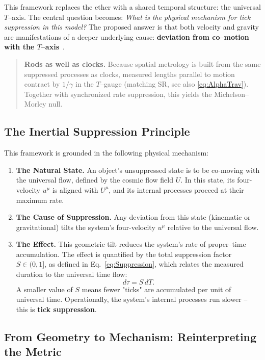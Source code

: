 \documentclass[12pt]{article}
\theoremstyle{plain}
\begin{document}
\medskip
\noindent
This framework replaces the ether with a shared temporal structure: the universal $T$–axis. The central question becomes: \textit{What is the physical mechanism for tick suppression in this model?} The proposed answer is that both velocity and gravity are manifestations of a deeper underlying cause: \textbf{deviation from co–motion with the $T$–axis}~\cite{Mermin1984}.

\begin{quote}\footnotesize
\textbf{Rods as well as clocks.} Because spatial metrology is built from the same suppressed processes as clocks, measured lengths parallel to motion contract by $1/\gamma$ in the $T$–gauge (matching SR, see also \eqref{eq:AlphaTrav}). Together with synchronized rate suppression, this yields the Michelson–Morley null.
\end{quote}

\subsection{The Inertial Suppression Principle}

This framework is grounded in the following physical mechanism:

\begin{enumerate}
    \item \textbf{The Natural State.} An object's unsuppressed state is to be co-moving with the universal flow, defined by the cosmic flow field $U$. In this state, its four-velocity $u^\mu$ is aligned with $U^\mu$, and its internal processes proceed at their maximum rate.

    \item \textbf{The Cause of Suppression.} Any deviation from this state (kinematic or gravitational) tilts the system’s four-velocity $u^\mu$ relative to the universal flow.

    \item \textbf{The Effect.} This geometric tilt reduces the system's rate of proper–time accumulation. The effect is quantified by the total suppression factor $S \in (0,1]$, as defined in Eq.~\eqref{eq:Suppression}, which relates the measured duration to the universal time flow:
    \[
    d\tau = S \, dT.
    \]
    A smaller value of $S$ means fewer "ticks" are accumulated per unit of universal time. Operationally, the system’s internal processes run slower – this is \textbf{tick suppression}.
\end{enumerate}

\subsection{From Geometry to Mechanism: Reinterpreting the Metric}
\end{document}
